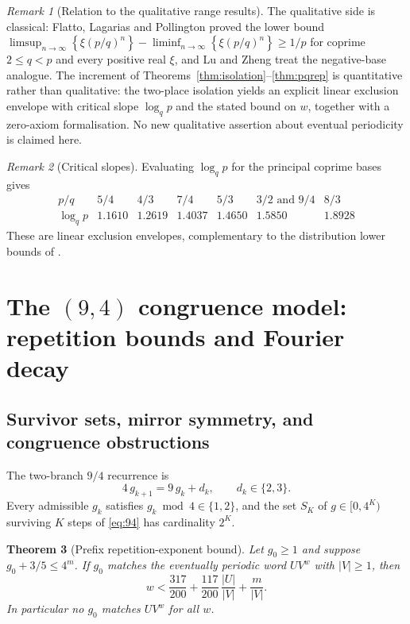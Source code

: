 \documentclass[11pt,a4paper]{article}
\newtheorem{theorem}{Theorem}[section]
\theoremstyle{remark}
\newtheorem{remark}[theorem]{Remark}
\newcommand{\fract}[1]{\left\{#1\right\}}
\begin{document}
\begin{remark}[Relation to the qualitative range results]
\label{rem:qualitative}
The qualitative side is classical: Flatto, Lagarias and Pollington \citep{flp1995} proved the lower bound $\limsup_{n\to\infty}\fract{\xi(p/q)^{n}} - \liminf_{n\to\infty}\fract{\xi(p/q)^{n}} \ge 1/p$ for coprime $2 \le q < p$ and every positive real $\xi$, and Lu and Zheng \citep{luzheng2026} treat the negative-base analogue. The increment of Theorems~\ref{thm:isolation}--\ref{thm:pqrep} is quantitative rather than qualitative: the two-place isolation yields an explicit linear exclusion envelope with critical slope $\log_{q} p$ and the stated bound on $w$, together with a zero-axiom formalisation. No new qualitative assertion about eventual periodicity is claimed here.
\end{remark}

\begin{remark}[Critical slopes]
Evaluating $\log_{q} p$ for the principal coprime bases gives
\[
  \begin{array}{c|cccccc}
    p/q & 5/4 & 4/3 & 7/4 & 5/3 & 3/2 \text{ and } 9/4 & 8/3 \\ \hline
    \log_{q} p & 1.1610 & 1.2619 & 1.4037 & 1.4650 & 1.5850 & 1.8928
  \end{array}
\]
These are linear exclusion envelopes, complementary to the distribution lower bounds of \citep{flp1995,luzheng2026}.
\end{remark}

\section{The \texorpdfstring{$(9,4)$}{(9,4)} congruence model: repetition bounds and Fourier decay}
\label{sec:model94}

\subsection{Survivor sets, mirror symmetry, and congruence obstructions}

The two-branch $9/4$ recurrence is
\begin{equation}
  4\, g_{k+1} = 9\, g_{k} + d_{k}, \qquad d_{k} \in \{2,3\}.
  \label{eq:94}
\end{equation}
Every admissible $g_{k}$ satisfies $g_{k} \bmod 4 \in \{1,2\}$, and the set $S_{K}$ of $g \in [0,4^{K})$ surviving $K$ steps of \eqref{eq:94} has cardinality $2^{K}$.

\begin{theorem}[Prefix repetition-exponent bound]
\label{thm:94rep}
Let $g_{0} \ge 1$ and suppose $g_{0} + 3/5 \le 4^{m}$. If $g_{0}$ matches the eventually periodic word $U V^{w}$ with $|V| \ge 1$, then
\[
  w < \frac{317}{200} + \frac{117}{200}\,\frac{|U|}{|V|} + \frac{m}{|V|}.
\]
In particular no $g_{0}$ matches $U V^{w}$ for all $w$.
\end{theorem}
\end{document}

